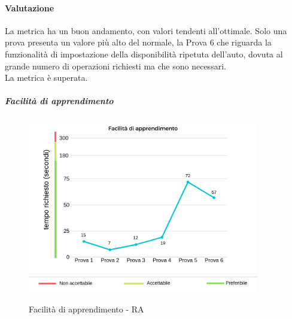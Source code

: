 	\paragraph*{Valutazione} La metrica ha un buon andamento, con valori tendenti all'ottimale. Solo una prova presenta un valore più alto del normale, la Prova 6 che riguarda la funzionalità di impostazione della disponibilità ripetuta dell'auto, dovuta al grande numero di operazioni richiesti ma che sono necessari. 
	\\
	La metrica è superata.
	\pagebreak
	\subparagraph{Facilità di apprendimento}
	\begin{center}
		\begin{figure}[h] 
			\centering 
			\includegraphics[width=0.90\textwidth]{res/images/new/facilitaApprendimento.png}\\
			\caption{Facilità di apprendimento - RA}
		\end{figure}
	\end{center}
